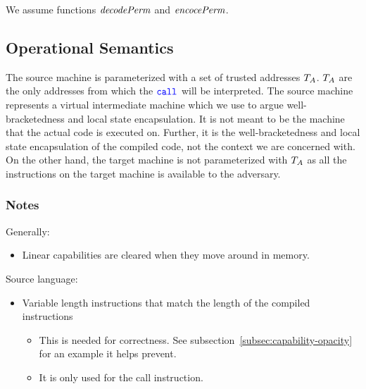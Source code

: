 \documentclass[a4paper]{article}
\begin{document}
We assume functions $\decPerm{}$ and $\encPerm{}$.

\subsection{Operational Semantics}
The source machine is parameterized with a set of trusted addresses $T_{A}$. $T_{A}$ are the only addresses from which the $\scall{}{}{}$ will be interpreted. The source machine represents a virtual intermediate machine which we use to argue well-bracketedness and local state encapsulation. It is not meant to be the machine that the actual code is executed on. Further, it is the well-bracketedness and local state encapsulation of the compiled code, not the context we are concerned with. On the other hand, the target machine is not parameterized with $T_{A}$ as all the instructions on the target machine is available to the adversary.

\subsubsection{Notes}
Generally:
\begin{itemize}
\item Linear capabilities are cleared when they move around in memory.
\end{itemize}

Source language:
\begin{itemize}
\item Variable length instructions that match the length of the compiled instructions
  \begin{itemize}
  \item This is needed for correctness. See subsection~\ref{subsec:capability-opacity} for an example it helps prevent.
  \item It is only used for the call instruction.
  \end{itemize}
\end{itemize}
\end{document}
